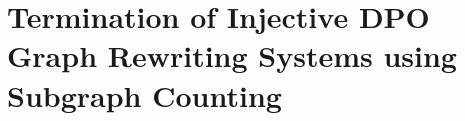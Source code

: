\documentclass{report}
\begin{document}
\chapter{Termination of Injective DPO Graph Rewriting
Systems using Subgraph Counting}
\label{chap:subgraph_counting}

% 
% 

% 

% 
   
%  
 
\end{document}
